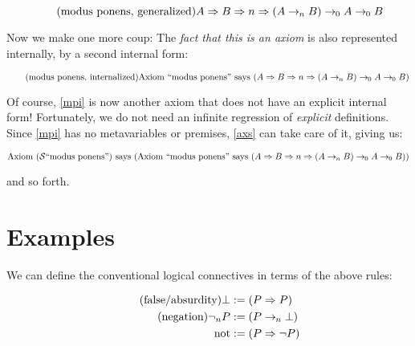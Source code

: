 \documentclass{article}
\begin{document}
  \begin{equation*}
    \tag{modus ponens, generalized}\label{mpg}
    A \Rightarrow B \Rightarrow n \Rightarrow (A \rightarrow_{\hspace{-0.04em}n} B) \rightarrow_{\hspace{-0.04em}0} A \rightarrow_{\hspace{-0.04em}0} B
  \end{equation*}

  Now we make one more coup: The \emph{fact that this is an axiom} is also represented internally, by a second internal form:

  \begin{equation*}
    \tag{modus ponens, internalized}\label{mpi}
    \mathrm{Axiom}\ 
      \mathrm{``modus\ ponens"}\\
    \ \mathrm{says}\ 
      (A \Rightarrow B \Rightarrow n \Rightarrow (A \rightarrow_{\hspace{-0.04em}n} B) \rightarrow_{\hspace{-0.04em}0} A \rightarrow_{\hspace{-0.04em}0} B)
   \\
  \end{equation*}

  Of course, \eqref{mpi} is now another axiom that does not have an explicit internal form!
  Fortunately, we do not need an infinite regression of \emph{explicit} definitions. Since \eqref{mpi} has no metavariables or premises, \eqref{axs} can take care of it, giving us:

  \begin{equation*}
    \axiom{(\wfsucc\mathrm{``modus\ ponens"})}{(
      \axiom{\mathrm{``modus\ ponens"}}{
        (\nameabst{A} \nameabst{B} \nameabst{n} (A \implies{n} B) \implies{\wfz} A \implies{\wfz} B)
      }
    )}\\
  \end{equation*}

  and so forth.

  \section{Examples}\label{structure}

  We can define the conventional logical connectives in terms of the above rules:

  \setlength{\jot}{0.4em}
  \begin{align*}
    \tag{false/absurdity}
    \bot &:= (P \Rightarrow{P})\\
    \tag{negation}
    \neg_{n} P &:= ({P \rightarrow_{\hspace{-0.04em}n} \bot})\\
    \mathrm{not} &:= (P \Rightarrow \neg P)\\
  \end{align*}
\end{document}
